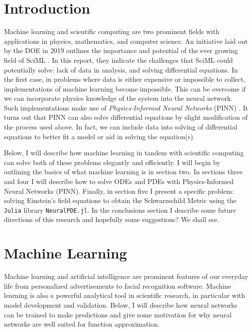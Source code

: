 \documentclass{CUP-JNL-DTM}%
\theoremstyle{definition}
\numberwithin{equation}{section}
\newcommand{\Julia}{\texttt{Julia} }
\begin{document}
\section{Introduction}

Machine learning and scientific computing are two prominent fields with applications in physics, mathematics, and computer science. An initiative laid out by the DOE in 2019 outlines the importance and potential of the ever growing field of SciML \cite{bakerWorkshopReportBasic2019}. In this report, they indicate the challenges that SciML could potentially solve: lack of data in analysis, and solving differential equations. In the first case, in problems where data is either expensive or impossible to collect, implementations of machine learning become impossible. This can be overcome if we can incorporate physics knowledge of the system into the neural network. Such implementations make use of \emph{Physics-Informed Neural Networks} (PINN) \cite{karniadakisPhysicsinformedMachineLearning2021}. It turns out that PINN can also solve differential equations by slight modification of the process used above. In fact, we can include data into solving of differential equations to better fit a model or aid in solving the equation(s). 

Below, I will describe how machine learning in tandem with scientific computing can solve both of these problems elegantly and efficiently. I will begin by outlining the basics of what machine learning is in section two. In sections three and four I will describe how to solve ODEs and PDEs with Physics-Informed Neural Networks (PINN). Finally, in section five I present a specific problem: solving Einstein's field equations to obtain the Schwarzschild Metric using the \Julia library \texttt{NeuralPDE.jl}. In the conclusions section I describe some future directions of this research and hopefully some suggestions? We shall see. 

\section{Machine Learning}

Machine learning and artificial intelligence are prominent features of our everyday life from personalized advertisements to facial recognition software. Machine learning is also a powerful analytical tool in scientific research, in particular with model development and validation. Below, I will describe how neural networks can be trained to make predictions and give some motivation for why neural networks are well suited for function approximation. 
\end{document}
